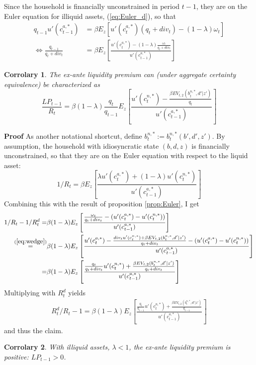 \documentclass[11pt]{article} %
\newtheorem{corr}{Corrolary}
\begin{document}
Since the household is financially unconstrained in period $t-1$, they are on the Euler equation for illiquid assets, (\ref{eq:Euler_d}), so that
\begin{align}
q_{t-1} u'(c_{t-1}^{a,*}) &= \beta E_z\left[ u'(c_t^{a,*})(q_t + div_t) - (1-\lambda)\omega_t\right]\\
\Leftrightarrow \frac{q_{t-1}}{q_t+div_t} &= \beta E_z \left[ \frac{u'(c_t^{a,*}) - (1-\lambda)\frac{\omega_t}{q_t+div_t}}{u'(c_{t-1}^{a,*})} \right] 
\end{align}
\begin{corr}\label{corr:LP}
The ex-ante liquidity premium can (under aggregate certainty equivalence) be characterized as
\begin{equation}
\frac{LP_{t-1}}{R_t} = \beta (1-\lambda) \frac{q_t}{q_{t-1}} E_z \left[ \frac{u'(c_t^{n,*}) - \frac{\beta EV_{t,2}(b^{n,*}_t,d'|z')}{q_t}}{u'(c_{t-1}^{a,*})} \right]
\end{equation}
\end{corr}
\textbf{Proof} As another notational shortcut, define $b^{n,*}_t := b^{n,*}_t(b',d',z')$. By assumption, the household with idiosyncratic state $(b,d,z)$ is financially unconstrained, so that they are on the Euler equation with respect to the liquid asset:
\begin{equation}
1/R_t = \beta E_z\left[ \frac{\lambda u'(c^{a,*}_t)+(1-\lambda) u'(c^{n,*}_t)}{u'(c^{a,*}_{t-1})}\right]
\end{equation}
Combining this with the result of proposition \ref{prop:Euler}, I get
\begin{align}
1/R_t - 1/R_t^d = & \beta (1-\lambda) E_z\left[ \frac{\frac{\omega_t}{q_t+div_t}-(u'(c_t^{a,*})-u'(c_t^{n,*}))}{u'(c_{t-1}^{a,*})} \right]\\
\overset{(\ref{eq:wedge})}{=} & \beta (1-\lambda) E_z \left[ \frac{u'(c_t^{a,*}) - \frac{div_t u'(c_t^{n,*}) + \beta EV_{t,2}(b_t^{n,*},d'|z')}{q_t+div_t} - (u'(c_t^{a,*})-u'(c_t^{n,*}))}{u'(c_{t-1}^{a,*})} \right]\\
= & \beta(1-\lambda) E_z\left[ \frac{\frac{q_t}{q_t+div_t}u'(c_t^{n,*})+ \frac{\beta EV_{t,2}(b_t^{n,*},d'|z')}{q_t+div_t}}{u'(c_{t-1}^{a,*})} \right]
\end{align}
Multiplying with $R_t^d$ yields
\begin{align}
R_t^d/R_t - 1 = \beta (1-\lambda) E_z\left[ \frac{\frac{q_t}{q_{t-1}}u'(c_t^{n,*}) +  \frac{\beta EV_{t,2}(b_t^{n,*},d'|z')}{q_{t-1}}}{u'(c_{t-1}^{a,*})}\right]
\end{align}
and thus the claim.
\begin{corr}\label{corr:LPpos}
With illiquid assets, $\lambda<1$, the ex-ante liquidity premium is positive: $LP_{t-1}>0$.
\end{corr}
\end{document}
